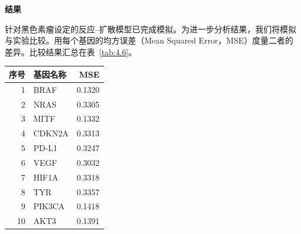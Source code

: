 \textbf{结果}

针对黑色素瘤设定的反应–扩散模型已完成模拟。为进一步分析结果，我们将模拟与实验比较。用每个基因的均方误差（Mean Squared Error，MSE）度量二者的差异。比较结果汇总在表~\ref{tab:4.6}。

\begin{table}[htbp]
  \centering
  \begin{tabular}{rlr}
    \toprule
    序号 & 基因名称 & MSE \\
    \midrule
     1 & BRAF   & 0.1320 \\
     2 & NRAS   & 0.3305 \\
     3 & MITF   & 0.1332 \\
     4 & CDKN2A & 0.3313 \\
     5 & PD-L1  & 0.3247 \\
     6 & VEGF   & 0.3032 \\
     7 & HIF1A  & 0.3318 \\
     8 & TYR    & 0.3357 \\
     9 & PIK3CA & 0.1418 \\
    10 & AKT3   & 0.1391 \\
    \bottomrule
  \end{tabular}
\end{table}
